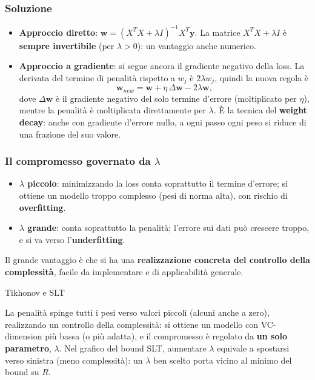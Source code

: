 \subsubsection{Soluzione}\label{soluzione}

\begin{itemize}
\tightlist
\item
  \textbf{Approccio diretto}:
  \(\mathbf{w} = (X^TX + \lambda I)^{-1}X^T\mathbf{y}\). La matrice
  \(X^TX + \lambda I\) è \textbf{sempre invertibile} (per
  \(\lambda > 0\)): un vantaggio anche numerico.
\item
  \textbf{Approccio a gradiente}: si segue ancora il gradiente negativo
  della loss. La derivata del termine di penalità rispetto a \(w_j\) è
  \(2\lambda w_j\), quindi la nuova regola è \[
  \mathbf{w}_{new} = \mathbf{w} + \eta\,\Delta\mathbf{w} - 2\lambda\mathbf{w},
  \] dove \(\Delta\mathbf{w}\) è il gradiente negativo del solo termine
  d'errore (moltiplicato per \(\eta\)), mentre la penalità è
  moltiplicata direttamente per \(\lambda\). È la tecnica del
  \textbf{weight decay}: anche con gradiente d'errore nullo, a ogni
  passo ogni peso si riduce di una frazione del suo valore.
\end{itemize}

\subsubsection{\texorpdfstring{Il compromesso governato da
\(\lambda\)}{Il compromesso governato da \textbackslash lambda}}\label{il-compromesso-governato-da-lambda}

\begin{itemize}
\tightlist
\item
  \textbf{\(\lambda\) piccolo}: minimizzando la loss conta soprattutto
  il termine d'errore; si ottiene un modello troppo complesso (pesi di
  norma alta), con rischio di \textbf{overfitting}.
\item
  \textbf{\(\lambda\) grande}: conta soprattutto la penalità; l'errore
  sui dati può crescere troppo, e si va verso l'\textbf{underfitting}.
\end{itemize}

Il grande vantaggio è che si ha una \textbf{realizzazione concreta del
controllo della complessità}, facile da implementare e di applicabilità
generale.

\begin{boxtip}{Tikhonov e SLT}

La penalità spinge tutti i pesi verso valori piccoli (alcuni anche a
zero), realizzando un controllo della complessità: si ottiene un modello
con VC-dimension più bassa (o più adatta), e il compromesso è regolato
da \textbf{un solo parametro}, \(\lambda\). Nel grafico del bound SLT,
aumentare \(\lambda\) equivale a spostarsi verso sinistra (meno
complessità): un \(\lambda\) ben scelto porta vicino al minimo del bound
su \(R\).

\end{boxtip}

